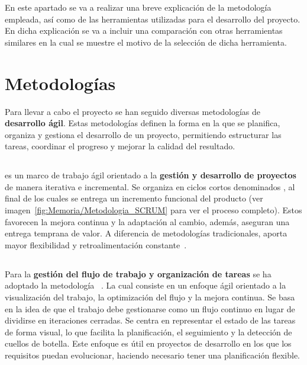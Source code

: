 En este apartado se va a realizar una breve explicación de la metodología empleada, así como de las herramientas utilizadas para el desarrollo del proyecto. En dicha explicación se va a incluir una comparación con otras herramientas similares en la cual se muestre el motivo de la selección de dicha herramienta. 
\section{Metodologías}
Para llevar a cabo el proyecto se han seguido diversas metodologías de \textbf{desarrollo ágil}. Estas metodologías definen la forma en la que se planifica, organiza y gestiona el desarrollo de un proyecto, permitiendo estructurar las tareas, coordinar el progreso y mejorar la calidad del resultado.

\subsection{}
 es un marco de trabajo ágil orientado a la \textbf{gestión y desarrollo de proyectos} de manera iterativa e incremental. Se organiza en ciclos cortos denominados , al final de los cuales se entrega un incremento funcional del producto (ver imagen~\ref{fig:Memoria/Metodologia_SCRUM} para ver el proceso  completo). Estos  favorecen la mejora continua y la adaptación al cambio, además, aseguran una entrega temprana de valor. A diferencia de metodologías tradicionales,  aporta mayor flexibilidad y retroalimentación constante~\cite{scrum:guide}. 


\subsection{}
Para la \textbf{gestión del flujo de trabajo y organización de tareas} se ha adoptado la metodología ~\cite{herramienta:kanban}. La cual consiste en un enfoque ágil orientado a la visualización del trabajo, la optimización del flujo y la mejora continua. Se basa en la idea de que el trabajo debe gestionarse como un flujo continuo en lugar de dividirse en iteraciones cerradas. Se centra en representar el estado de las tareas de forma visual, lo que facilita la planificación, el seguimiento y la detección de cuellos de botella. Este enfoque es útil en proyectos de desarrollo  en los que los requisitos puedan evolucionar, haciendo necesario tener una planificación flexible.

